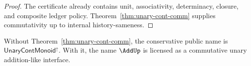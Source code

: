 \begin{proof}
The certificate already contains unit, associativity, determinacy, closure, and composite ledger policy. Theorem~\ref{thm:unary-cont-comm} supplies commutativity up to internal history-sameness.
\end{proof}

\begin{remark}
Without Theorem~\ref{thm:unary-cont-comm}, the conservative public name is \(\mathsf{UnaryContMonoid}^{\uparrow}\). With it, the name \(\AddUp\) is licensed as a commutative unary addition-like interface.
\end{remark}
